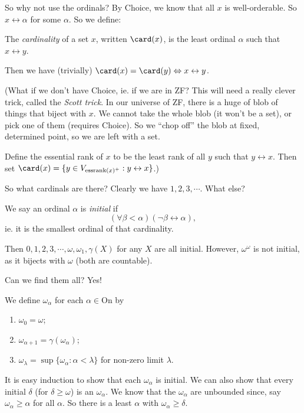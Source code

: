 \documentclass[a4paper]{article}
\begin{document}
So why not use the ordinals? By Choice, we know that all $x$ is well-orderable. So $x\leftrightarrow \alpha$ for some $\alpha$. So we define:
\begin{defi}[Cardinality]
  The \emph{cardinality} of a set $x$, written $\card(x)$, is the least ordinal $\alpha$ such that $x\leftrightarrow y$.
\end{defi}
Then we have (trivially) $\card(x) = \card(y) \Leftrightarrow x\leftrightarrow y$.

(What if we don't have Choice, ie. if we are in ZF? This will need a really clever trick, called the \emph{Scott trick}. In our universe of ZF, there is a huge of blob of things that biject with $x$. We cannot take the whole blob (it won't be a set), or pick one of them (requires Choice). So we ``chop off'' the blob at fixed, determined point, so we are left with a set.

Define the essential rank of $x$ to be the least rank of all $y$ such that $y\leftrightarrow x$. Then set $\card (x) = \{y\in V_{\mathrm{essrank}(x)^+}: y\leftrightarrow x\}$.)

So what cardinals are there? Clearly we have $1, 2, 3, \cdots$. What else?

\begin{defi}
  We say an ordinal $\alpha$ is \emph{initial} if
  \[
    (\forall \beta < \alpha)(\neg \beta \leftrightarrow \alpha),
  \]
  ie. it is the smallest ordinal of that cardinality.
\end{defi}

Then $0, 1, 2, 3, \cdots, \omega, \omega_1, \gamma(X)$ for any $X$ are all initial. However, $\omega^\omega$ is not initial, as it bijects with $\omega$ (both are countable).

Can we find them all? Yes!
\begin{defi}
  We define $\omega_\alpha$ for each $\alpha \in \mathrm{On}$ by
  \begin{enumerate}
    \item $\omega_0 = \omega$;
    \item $\omega_{\alpha + 1} = \gamma(\omega_\alpha)$;
    \item $\omega_\lambda = \sup\{\omega_\alpha: \alpha < \lambda\}$ for non-zero limit $\lambda$.
  \end{enumerate}
\end{defi}
It is easy induction to show that each $\omega_\alpha$ is initial. We can also show that every initial $\delta$ (for $\delta \geq \omega$) is an $\omega_\alpha$. We know that the $\omega_\alpha$ are unbounded since, say $\omega_\alpha \geq \alpha$ for all $\alpha$. So there is a least $\alpha$ with $\omega_\alpha \geq \delta$.
\end{document}
